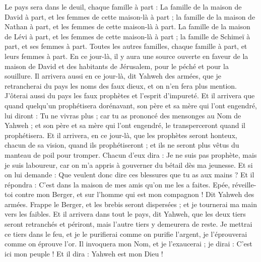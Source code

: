 \begin{multicols}{2}
Le pays sera dans le deuil, chaque famille à part : La famille de la maison de David à part, et les femmes de cette maison-là à part ; la famille de la maison de Nathan à part, et les femmes de cette maison-là à part.
La famille de la maison de Lévi à part, et les femmes de cette maison-là à part ; la famille de Schimeï à part, et ses femmes à part.
Toutes les autres familles, chaque famille à part, et leurs femmes à part.
\VerseOne{}En ce jour-là, il y aura une source ouverte en faveur de la maison de David et des habitants de Jérusalem, pour le péché et pour la souillure.
Il arrivera aussi en ce jour-là, dit Yahweh des armées, que je retrancherai du pays les noms des faux dieux, et on n'en fera plus mention. J'ôterai aussi du pays les faux prophètes et l'esprit d'impureté.
Et il arrivera que quand quelqu'un prophétisera dorénavant, son père et sa mère qui l'ont engendré, lui diront : Tu ne vivras plus ; car tu as prononcé des mensonges au Nom de Yahweh ; et son père et sa mère qui l'ont engendré, le transperceront quand il prophétisera.
Et il arrivera, en ce jour-là, que les prophètes seront honteux, chacun de sa vision, quand ils prophétiseront ; et ils ne seront plus vêtus du manteau de poil pour tromper.
Chacun d'eux dira : Je ne suis pas prophète, mais je suis laboureur, car on m'a appris à gouverner du bétail dès ma jeunesse.
Et si on lui demande : Que veulent donc dire ces blessures que tu as aux mains ? Et il répondra : C'est dans la maison de mes amis qu'on me les a faites.
Epée, réveille-toi contre mon Berger, et sur l'homme qui est mon compagnon ! Dit Yahweh des armées. Frappe le Berger, et les brebis seront dispersées ; et je tournerai ma main vers les faibles.
Et il arrivera dans tout le pays, dit Yahweh, que les deux tiers seront retranchés et périront, mais l'autre tiers y demeurera de reste.
Je mettrai ce tiers dans le feu, et je le purifierai comme on purifie l'argent, je l'éprouverai comme on éprouve l'or. Il invoquera mon Nom, et je l'exaucerai ; je dirai : C'est ici mon peuple ! Et il dira : Yahweh est mon Dieu !

\end{multicols}
